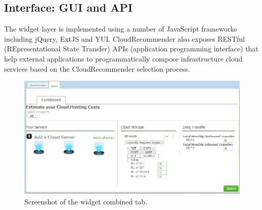 \subsection{Interface: GUI and API}
The widget layer is implemented using a number of JavaScript frameworks including jQuery, ExtJS and YUI. CloudRecommender also exposes RESTful
(REpresentational State Transfer) APIs (application programming interface) that help external applications to programmatically compose infrastructure cloud services based on the CloudRecommender selection process.

\begin{figure}
  \includegraphics[width=\textwidth,keepaspectratio]{Figures/system/CloudRecommender/widget_combined.jpg}
  \caption{Screenshot of the widget combined tab.}
  \label{fig:widget_combined}
\end{figure}

